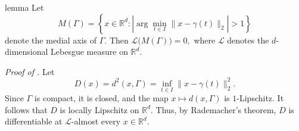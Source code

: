 \documentclass[11pt]{article}
\begin{document}
\begin{appendices}



\begin{restatable}{lemma}{} \label{lemma: singular set measure}
    Let
    \[
        M(\Gamma)
        =
        \left\{
        x \in \mathbb{R}^d :
        \left|\arg\min_{t\in I}\|x-\gamma(t)\|_2\right| > 1
        \right\}
    \]
    denote the medial axis of $\Gamma$. Then $\mathcal{L}\big(M(\Gamma)\big)=0,$ where $\mathcal{L}$ denotes the $d$-dimensional Lebesgue measure on $\mathbb{R}^d$.
\end{restatable}

\noindent \textit{Proof of .}
Let
\[
    D(x) = d^2(x,\Gamma)
    =
    \inf_{t\in I}\|x-\gamma(t)\|_2^2.
\]
Since $\Gamma$ is compact, it is closed, and the map $x\mapsto d(x,\Gamma)$ is $1$-Lipschitz. It follows that $D$ is locally Lipschitz on $\mathbb{R}^d$. Thus, by Rademacher's theorem, $D$ is differentiable at $\mathcal{L}$-almost every $x\in\mathbb{R}^d$.


\end{appendices}
\end{document}
